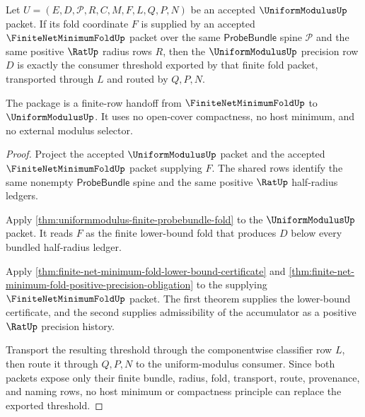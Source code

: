 \begin{theorem}
\label{thm:uniformmodulus-finite-net-consumer-threshold-package}
Let $U=(E,D,\mathcal{P},R,C,M,F,L,Q,P,N)$ be an accepted $\UniformModulusUp$ packet. If its fold coordinate $F$ is supplied by an accepted $\FiniteNetMinimumFoldUp$ packet over the same $\mathsf{ProbeBundle}$ spine $\mathcal{P}$ and the same positive $\RatUp$ radius rows $R$, then the $\UniformModulusUp$ precision row $D$ is exactly the consumer threshold exported by that finite fold packet, transported through $L$ and routed by $Q,P,N$.

The package is a finite-row handoff from $\FiniteNetMinimumFoldUp$ to $\UniformModulusUp$. It uses no open-cover compactness, no host minimum, and no external modulus selector.
\end{theorem}
\begin{proof}
Project the accepted $\UniformModulusUp$ packet and the accepted $\FiniteNetMinimumFoldUp$ packet supplying $F$. The shared rows identify the same nonempty $\mathsf{ProbeBundle}$ spine and the same positive $\RatUp$ half-radius ledgers.

Apply \autoref{thm:uniformmodulus-finite-probebundle-fold} to the $\UniformModulusUp$ packet. It reads $F$ as the finite lower-bound fold that produces $D$ below every bundled half-radius ledger.

Apply \autoref{thm:finite-net-minimum-fold-lower-bound-certificate} and \autoref{thm:finite-net-minimum-fold-positive-precision-obligation} to the supplying $\FiniteNetMinimumFoldUp$ packet. The first theorem supplies the lower-bound certificate, and the second supplies admissibility of the accumulator as a positive $\RatUp$ precision history.

Transport the resulting threshold through the componentwise classifier row $L$, then route it through $Q,P,N$ to the uniform-modulus consumer. Since both packets expose only their finite bundle, radius, fold, transport, route, provenance, and naming rows, no host minimum or compactness principle can replace the exported threshold.
\end{proof}

